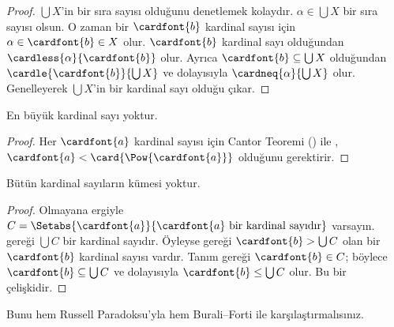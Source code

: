 \documentclass[../../../include/open-logic-section]{subfiles}
\begin{document}
\begin{proof}
$\bigcup X$'in bir sıra sayısı olduğunu denetlemek kolaydır.
$\alpha\in\bigcup X$ bir sıra sayısı olsun. O zaman bir $\cardfont{b}$
kardinal sayısı için $\alpha\in\cardfont{b}\in X$ olur.
$\cardfont{b}$ kardinal sayı olduğundan
$\cardless{\alpha}{\cardfont{b}}$ olur. Ayrıca
$\cardfont{b}\subseteq\bigcup X$ olduğundan
$\cardle{\cardfont{b}}{\bigcup X}$ ve dolayısıyla
$\cardneq{\alpha}{\bigcup X}$ olur. Genelleyerek $\bigcup X$'in bir
kardinal sayı olduğu çıkar.
\end{proof}

\begin{thm}
En büyük kardinal sayı yoktur.
\end{thm}

\begin{proof}
Her $\cardfont{a}$ kardinal sayısı için Cantor Teoremi
() ile
,
$\cardfont{a}<\card{\Pow{\cardfont{a}}}$ olduğunu gerektirir.
\end{proof}

\begin{thm}
Bütün kardinal sayıların kümesi yoktur.
\end{thm}

\begin{proof}
Olmayana ergiyle
$C=\Setabs{\cardfont{a}}{\cardfont{a}\text{ bir kardinal sayıdır}}$
varsayın.  gereği $\bigcup C$ bir kardinal
sayıdır. Öyleyse  gereği
$\cardfont{b}>\bigcup C$ olan bir $\cardfont{b}$ kardinal sayısı vardır.
Tanım gereği $\cardfont{b}\in C$; böylece
$\cardfont{b}\subseteq\bigcup C$ ve dolayısıyla
$\cardfont{b}\leq\bigcup C$ olur. Bu bir çelişkidir.
\end{proof}

Bunu hem Russell Paradoksu'yla hem Burali--Forti ile karşılaştırmalısınız.
\end{document}
